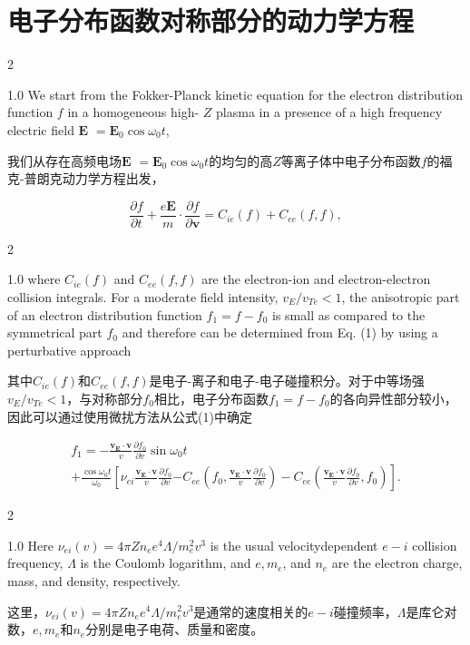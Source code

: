\documentclass[oneside,onecolumn]{article}
\newcommand\enzhbox[2]{
	\quad\par \begin{paracol}{2} 
			\begin{spacing}{1.0}
					\footnotesize  #1
			\end{spacing}
			
		\switchcolumn[1] 
		#2
	\end{paracol} 
}
\begin{document}
\begin{sloppypar}
  \section{电子分布函数对称部分的动力学方程}

\enzhbox{  We start from the Fokker-Planck kinetic equation for the electron distribution function $f$ in a homogeneous high- $Z$ plasma in a presence of a high frequency electric field $\mathbf{E}$ $=\mathbf{E}_{0} \cos \omega_{0} t$,
}{
我们从存在高频电场$\mathbf{E}$ $=\mathbf{E}_{0} \cos \omega_{0} t$的均匀的高$Z$等离子体中电子分布函数$f$的福克-普朗克动力学方程出发，
}
  
  \begin{equation}
  \frac{\partial f}{\partial t}+\frac{e \mathbf{E}}{m} \cdot \frac{\partial f}{\partial \mathbf{v}}=C_{i e}(f)+C_{e e}(f, f),
  \end{equation}
  

\enzhbox{  where $C_{i e}(f)$ and $C_{e e}(f, f)$ are the electron-ion and electron-electron collision integrals. For a moderate field intensity, $v_{E} / v_{T e}<1$, the anisotropic part of an electron distribution function $f_{1}=f-f_{0}$ is small as compared to the symmetrical part $f_{0}$ and therefore can be determined from Eq. (1) by using a perturbative approach
}{
其中$C_{i e}(f)$和$C_{e e}(f, f)$是电子-离子和电子-电子碰撞积分。对于中等场强$v_{E} / v_{T e}<1$，与对称部分$f_{0}$相比，电子分布函数$f_{1}=f-f_{0}$的各向异性部分较小，因此可以通过使用微扰方法从公式(1)中确定
}
  
  \begin{equation}
  \begin{gathered}
  	f_{1}=  -\frac{\mathbf{v}_{\mathbf{E}} \cdot \mathbf{v}}{v} \frac{\partial f_{0}}{\partial v} \sin \omega_{0} t\\+\frac{\cos \omega_{0} t}{\omega_{0}}\left[\nu_{e i} \frac{\mathbf{v}_{\mathbf{E}} \cdot \mathbf{v}}{v} \frac{\partial f_{0}}{\partial v}\right.
  \left.-C_{e e}\left(f_{0}, \frac{\mathbf{v}_{\mathbf{E}} \cdot \mathbf{v}}{v} \frac{\partial f_{0}}{\partial v}\right)-C_{e e}\left(\frac{\mathbf{v}_{\mathbf{E}} \cdot \mathbf{v}}{v} \frac{\partial f_{0}}{\partial v}, f_{0}\right)\right] .
  \end{gathered}
  \end{equation}

  

\enzhbox{  Here $\nu_{e i}(v)=4 \pi Z n_{e} e^{4} \Lambda / m_{e}^{2} v^{3}$ is the usual velocitydependent $e-i$ collision frequency, $\Lambda$ is the Coulomb logarithm, and $e, m_{e}$, and $n_{e}$ are the electron charge, mass, and density, respectively.
}{
这里，$\nu_{e i}(v)=4 \pi Z n_{e} e^{4} \Lambda / m_{e}^{2} v^{3}$是通常的速度相关的$e-i$碰撞频率，$\Lambda$是库仑对数，$e, m_{e}$和$n_{e}$分别是电子电荷、质量和密度。
}
  



\end{sloppypar}
\end{document}
